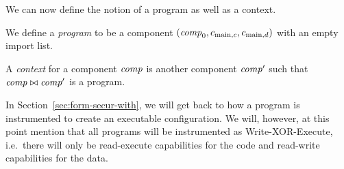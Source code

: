 \documentclass[acmsmall,review,anonymous]{acmart}\settopmatter{printfolios=true,printccs=false,printacmref=false}
\renewcommand{\comp}{\var{comp}}
\begin{document}
We can now define the notion of a program as well as a context.
\begin{definition}
  \label{def:program-and-context}
  We define a \emph{program} to be a component $(\comp_0,c_{\mathrm{main},c}, c_{\mathrm{main},d})$ with an empty import list.

  A \emph{context} for a component $\comp$ is another component $\comp'$ such that $\comp \bowtie \comp'$ is a program.
\end{definition}
In Section~\ref{sec:form-secur-with}, we will get back to how a program is instrumented to create an executable configuration.
We will, however, at this point mention that all programs will be instrumented as Write-XOR-Execute, i.e.\ there will only be read-execute capabilities for the code and read-write capabilities for the data.
\end{document}
